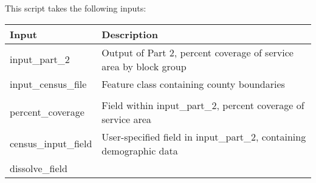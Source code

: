 \documentclass[11pt,]{article}
\begin{document}
This script takes the following inputs:

\begin{longtable}[]{@{}ll@{}}
\toprule
\begin{minipage}[b]{0.23\columnwidth}\raggedright\strut
Input\strut
\end{minipage} & \begin{minipage}[b]{0.71\columnwidth}\raggedright\strut
Description\strut
\end{minipage}\tabularnewline
\midrule
\endhead
\begin{minipage}[t]{0.23\columnwidth}\raggedright\strut
input\_part\_2\strut
\end{minipage} & \begin{minipage}[t]{0.71\columnwidth}\raggedright\strut
Output of Part 2, percent coverage of service area by block group\strut
\end{minipage}\tabularnewline
\begin{minipage}[t]{0.23\columnwidth}\raggedright\strut
input\_census\_file\strut
\end{minipage} & \begin{minipage}[t]{0.71\columnwidth}\raggedright\strut
Feature class containing county boundaries\strut
\end{minipage}\tabularnewline
\begin{minipage}[t]{0.23\columnwidth}\raggedright\strut
\strut
\end{minipage}\tabularnewline
\begin{minipage}[t]{0.23\columnwidth}\raggedright\strut
percent\_coverage\strut
\end{minipage} & \begin{minipage}[t]{0.71\columnwidth}\raggedright\strut
Field within input\_part\_2, percent coverage of service area\strut
\end{minipage}\tabularnewline
\begin{minipage}[t]{0.23\columnwidth}\raggedright\strut
census\_input\_field\strut
\end{minipage} & \begin{minipage}[t]{0.71\columnwidth}\raggedright\strut
User-specified field in input\_part\_2, containing demographic
data\strut
\end{minipage}\tabularnewline
\begin{minipage}[t]{0.23\columnwidth}\raggedright\strut
dissolve\_field\strut
\end{minipage} & \begin{minipage}[t]{0.71\columnwidth}\raggedright\strut

\end{minipage}
\end{longtable}
\end{document}

